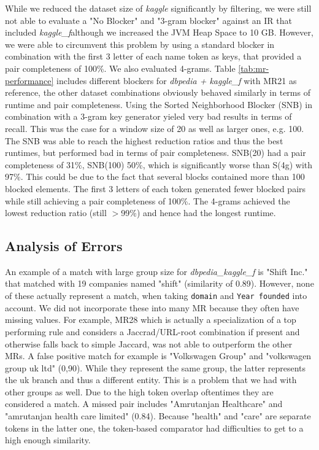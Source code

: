 \documentclass[11pt,titlepage,oneside,openany]{article}
\begin{document}
While we reduced the dataset size of \textit{kaggle} significantly by filtering, we were still not able to evaluate a "No Blocker" and "3-gram blocker" against an IR that included \textit{kaggle\_f}although we increased the JVM Heap Space to 10 GB. However, we were able to circumvent this problem by using a standard blocker in combination with the first 3 letter of each name token as keys, that provided a pair completeness of 100\%. We also evaluated 4-grams. Table \ref{tab:mr-performance} includes different blockers for \textit{dbpedia + kaggle\_f} with MR21 as reference, the other dataset combinations obviously behaved similarly in terms of runtime and pair completeness. Using the Sorted Neighborhood Blocker (SNB) in combination with a 3-gram key generator yieled very bad results in terms of recall. This was the case for a window size of 20 as well as larger ones, e.g. 100. The SNB was able to reach the highest reduction ratios and thus the best runtimes, but performed bad in terms of pair completeness. SNB(20) had a pair completeness of 31\%, SNB(100) 50\%, which is significantly worse than S(4g) with 97\%. This could be due to the fact that several blocks contained more than 100 blocked elements. The first 3 letters of each token generated fewer blocked pairs while still achieving a pair completeness of 100\%. The 4-grams achieved the lowest reduction ratio (still $>$99\%) and hence had the longest runtime.


\subsection{Analysis of Errors}
\label{sec:errors}
An example of a match with large group size for \textit{dbpedia\_kaggle\_f} is "Shift Inc." that matched with 19 companies named "shift" (similarity of 0.89). However, none of these actually represent a match, when taking {\tt domain} and {\tt Year founded} into account. We did not incorporate these into many MR because they often have missing values. For example, MR28 which is actually a specialization of a top performing rule and considers a Jaccrad/URL-root combination if present and otherwise falls back to simple Jaccard, was not able to outperform the other MRs.
A false positive match for example is "Volkswagen Group" and "volkswagen group uk ltd" (0,90). While they represent the same group, the latter represents the uk branch and thus a different entity. This is a problem that we had with other groups as well. Due to the high token overlap oftentimes they are considered a match.
A missed pair includes "Amrutanjan Healthcare" and "amrutanjan health care limited" (0.84). Because "health" and "care" are separate tokens in the latter one, the token-based comparator had difficulties to get to a high enough similarity.
\end{document}
